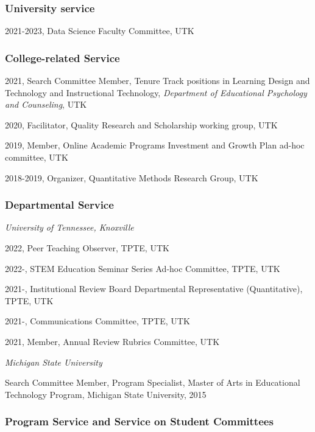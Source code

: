 \documentclass[
  14,
]{article}
\begin{document}
\hypertarget{university-service}{%
\subsubsection{University service}\label{university-service}}

2021-2023, Data Science Faculty Committee, UTK

\hypertarget{college-related-service}{%
\subsubsection{College-related Service}\label{college-related-service}}

2021, Search Committee Member, Tenure Track positions in Learning Design
and Technology and Instructional Technology, \emph{Department of
Educational Psychology and Counseling}, UTK

2020, Facilitator, Quality Research and Scholarship working group, UTK

2019, Member, Online Academic Programs Investment and Growth Plan ad-hoc
committee, UTK

2018-2019, Organizer, Quantitative Methods Research Group, UTK

\hypertarget{departmental-service}{%
\subsubsection{Departmental Service}\label{departmental-service}}

\emph{University of Tennessee, Knoxville}

2022, Peer Teaching Observer, TPTE, UTK

2022-, STEM Education Seminar Series Ad-hoc Committee, TPTE, UTK

2021-, Institutional Review Board Departmental Representative
(Quantitative), TPTE, UTK

2021-, Communications Committee, TPTE, UTK

2021, Member, Annual Review Rubrics Committee, UTK

\emph{Michigan State University}

Search Committee Member, Program Specialist, Master of Arts in
Educational Technology Program, Michigan State University, 2015

\hypertarget{program-service-and-service-on-student-committees}{%
\subsubsection{Program Service and Service on Student
Committees}\label{program-service-and-service-on-student-committees}}
\end{document}
